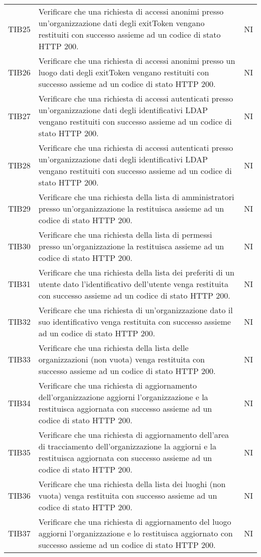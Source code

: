 {\begin{longtable}{ c C{13cm} C{1cm}}
TIB25 & Verificare che una richiesta di accessi anonimi presso un'organizzazione dati degli exitToken vengano restituiti con successo assieme ad un codice di stato HTTP 200. & NI \\
TIB26 & Verificare che una richiesta di accessi anonimi presso un luogo dati degli exitToken vengano restituiti con successo assieme ad un codice di stato HTTP 200. & NI \\
TIB27 & Verificare che una richiesta di accessi autenticati presso un'organizzazione dati degli identificativi LDAP vengano restituiti con successo assieme ad un codice di stato HTTP 200. & NI \\
TIB28 & Verificare che una richiesta di accessi autenticati presso un'organizzazione dati degli identificativi LDAP vengano restituiti con successo assieme ad un codice di stato HTTP 200. & NI \\
TIB29 & Verificare che una richiesta della lista di amministratori presso un'organizzazione la restituisca assieme ad un codice di stato HTTP 200. & NI \\
TIB30 & Verificare che una richiesta della lista di permessi presso un'organizzazione la restituisca assieme ad un codice di stato HTTP 200. & NI \\
TIB31 & Verificare che una richiesta della lista dei preferiti di un utente dato l'identificativo dell'utente venga restituita con successo assieme ad un codice di stato HTTP 200. & NI \\
TIB32 & Verificare che una richiesta di un'organizzazione dato il suo identificativo venga restituita con successo assieme ad un codice di stato HTTP 200. & NI \\
TIB33 & Verificare che una richiesta della lista delle organizzazioni (non vuota) venga restituita con successo assieme ad un codice di stato HTTP 200. & NI \\
TIB34 & Verificare che una richiesta di aggiornamento dell'organizzazione aggiorni l'organizzazione e la restituisca aggiornata con successo assieme ad un codice di stato HTTP 200. & NI \\
TIB35 & Verificare che una richiesta di aggiornamento dell'area di tracciamento dell'organizzazione la aggiorni e la restituisca aggiornata con successo assieme ad un codice di stato HTTP 200. & NI \\
TIB36 & Verificare che una richiesta della lista dei luoghi (non vuota) venga restituita con successo assieme ad un codice di stato HTTP 200. & NI \\
TIB37 & Verificare che una richiesta di aggiornamento del luogo aggiorni l'organizzazione e lo restituisca aggiornato con successo assieme ad un codice di stato HTTP 200. & NI \\

\end{longtable}}
